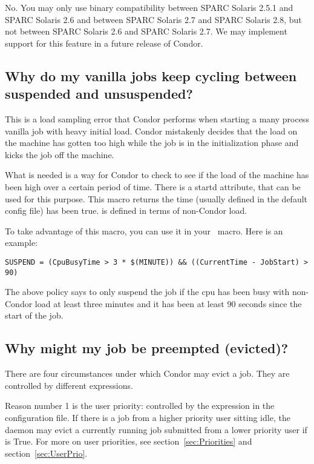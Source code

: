 No. You may only use binary compatibility between SPARC Solaris 2.5.1
and SPARC Solaris 2.6 and between SPARC Solaris 2.7 and SPARC Solaris
2.8, but not between SPARC Solaris 2.6 and SPARC Solaris 2.7.  We may
implement support for this feature in a future release of Condor.

\subsection{Why do my vanilla jobs keep cycling between suspended and
unsuspended?}

This is a load sampling error that Condor performs when starting a many
process vanilla job with heavy initial load.
Condor mistakenly decides that the load on the machine has gotten too
high while the job is in the initialization phase and kicks the job off
the machine.

What is needed is a way for Condor to check to see if the load of the machine
has been high over a certain period of time. There is a startd attribute,
 that can be used for this purpose. This macro
returns the time (usually defined in the default
config file) has been true.  is defined in terms of
non-Condor load.

To take advantage of this macro, you can use it in your \ macro.
Here is an example:
\begin{verbatim}
SUSPEND = (CpuBusyTime > 3 * $(MINUTE)) && ((CurrentTime - JobStart) > 90)
\end{verbatim}

The above policy says to only suspend the job if the cpu has been busy
with non-Condor load at least three minutes and it has been at least 90
seconds since the start of the job.

\subsection{Why might my job be preempted (evicted)?}

There are four circumstances under which Condor may evict a job.
They are controlled by different expressions.

Reason number 1 is the user priority:
controlled by the 
expression in the configuration file.
If there is a job from a 
higher priority user sitting idle,
the  daemon may evict 
a currently running job submitted from a lower priority user if 
 is True.
For more on user priorities,
see section~\ref{sec:Priorities} and
section~\ref{sec:UserPrio}.

